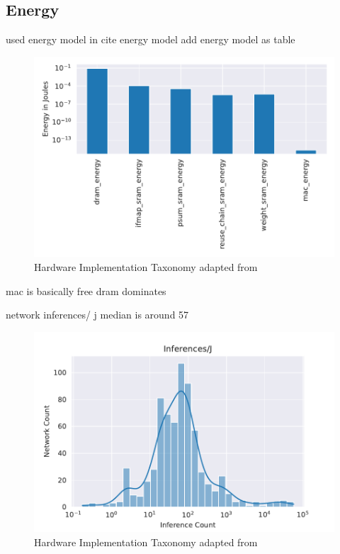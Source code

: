 \subsection{Energy}
\label{chap:hero:sim_platform:cigar_side}

used energy model in cite energy model
add energy model as table

\begin{figure}[ht]
    \centering
    \includegraphics[scale=0.58]{Plots/energy/barplot.pdf}
    \caption{Hardware Implementation Taxonomy adapted from \cite{maestro}}
    \label{fig:hw_taxonomy}
\end{figure}

mac is basically free
dram dominates


network inferences/ j median is around 57

\begin{figure}[ht]
    \centering
    \includegraphics[scale=0.58]{Plots/energy/inferences.pdf}
    \caption{Hardware Implementation Taxonomy adapted from \cite{maestro}}
    \label{fig:hw_taxonomy}
\end{figure}


